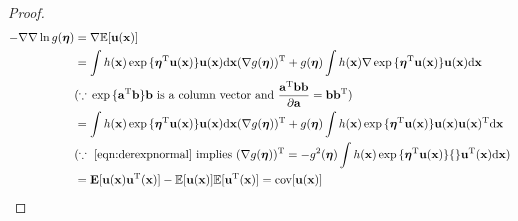 \begin{proof}
\begin{equation}
\begin{split}
-\nabla{}\nabla{}\ln{}g(\boldsymbol{\eta})&=\nabla{}\mathbb{E}[\mathbf{u}(\mathbf{x})]\\
&=\int{}h(\mathbf{x})\exp{}\{\boldsymbol{\eta}^{\mathrm{T}}\mathbf{u}(\mathbf{x})\}\mathbf{u}(\mathbf{x})\text{d}\mathbf{x}(\nabla{}g(\boldsymbol{\eta}))^{\mathrm{T}}+g(\boldsymbol{\eta})\int{}h(\mathbf{x})\nabla\exp{}\{\boldsymbol{\eta}^{\mathrm{T}}\mathbf{u}(\mathbf{x})\}\mathbf{u}(\mathbf{x})\text{d}\mathbf{x}\\
&(\because{}\exp{}\{\mathbf{a}^{\mathrm{T}}\mathbf{b}\}\mathbf{b}\text{ is a column vector and }\frac{\mathbf{a}^{\mathrm{T}}\mathbf{b}\mathbf{b}}{\partial{}\mathbf{a}}=\mathbf{b}\mathbf{b}^{\mathrm{T}})\\
&=\int{}h(\mathbf{x})\exp{}\{\boldsymbol{\eta}^{\mathrm{T}}\mathbf{u}(\mathbf{x})\}\mathbf{u}(\mathbf{x})\text{d}\mathbf{x}(\nabla{}g(\boldsymbol{\eta}))^{\mathrm{T}}+g(\boldsymbol{\eta})\int{}h(\mathbf{x})\exp{}\{\boldsymbol{\eta}^{\mathrm{T}}\mathbf{u}(\mathbf{x})\}\mathbf{u}(\mathbf{x})\mathbf{u}(\mathbf{x})^{\mathrm{T}}\text{d}\mathbf{x}\\
&(\because{}\text{ \eqref{eqn:derexpnormal} implies }(\nabla{}g(\boldsymbol{\eta}))^{\mathrm{T}}=-g^2(\boldsymbol{\eta})\int{}h(\mathbf{x})\exp{}\{\boldsymbol{\eta}^{\mathrm{T}}\mathbf{u}(\mathbf{x})\}\{\}\mathbf{u}^{\mathrm{T}}(\mathbf{x})\text{d}\mathbf{x})\\
&=\mathbf{E}[\mathbf{u}(\mathbf{x})\mathbf{u}^{\mathrm{T}}(\mathbf{x})]-\mathbb{E}[\mathbf{u}(\mathbf{x})]\mathbb{E}[\mathbf{u}^{\mathrm{T}}(\mathbf{x})]=\text{cov}[\mathbf{u}(\mathbf{x})]
\end{split}
\end{equation}
\end{proof}
